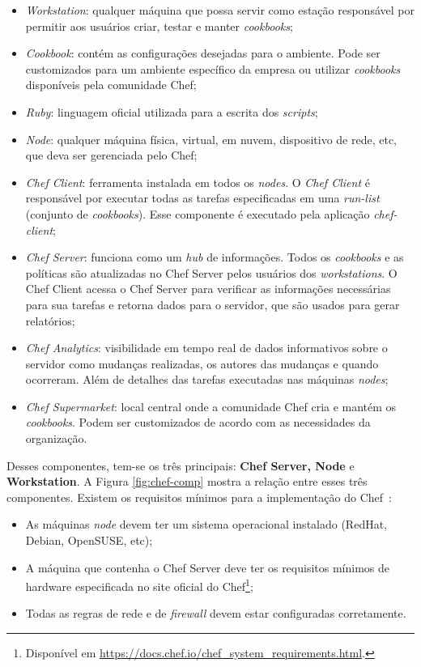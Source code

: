 \begin{itemize}
  \item \textit{Workstation}: qualquer máquina que possa servir como estação
    responsável por permitir aos usuários criar, testar e manter \textit{cookbooks};
  \item \textit{Cookbook}: contém as configurações desejadas para o ambiente.
    Pode ser customizados para um ambiente específico da empresa ou utilizar
    \textit{cookbooks} disponíveis pela comunidade Chef;
  \item \textit{Ruby}: linguagem oficial utilizada para a escrita dos \textit{scripts};
  \item \textit{Node}: qualquer máquina física, virtual, em nuvem, dispositivo
    de rede, etc, que deva ser gerenciada pelo Chef;
  \item \textit{Chef Client}: ferramenta instalada em todos os \textit{nodes}. O
    \textit{Chef Client} é responsável por executar todas as tarefas especificadas
    em uma \textit{run-list} (conjunto de \textit{cookbooks}). Esse componente é
    executado pela aplicação \textit{chef-client};
  \item \textit{Chef Server}: funciona como um \textit{hub} de informações. Todos os
    \textit{cookbooks} e as políticas são atualizadas no Chef Server pelos usuários
    dos \textit{workstations}. O Chef Client acessa o Chef Server para verificar
    as informações necessárias para sua tarefas e retorna dados para o servidor,
    que são usados para gerar relatórios;
  \item \textit{Chef Analytics}: visibilidade em tempo real de dados informativos
    sobre o servidor como mudanças realizadas, os autores das mudanças e quando
    ocorreram. Além de detalhes das tarefas executadas nas máquinas \textit{nodes};
  \item \textit{Chef Supermarket}: local central onde a comunidade Chef cria e
    mantém os \textit{cookbooks}. Podem ser customizados de acordo com as necessidades
    da organização.
\end{itemize}

Desses componentes, tem-se os três principais: \textbf{Chef Server, Node} e \textbf{Workstation}.
A Figura \ref{fig:chef-comp} mostra a relação entre esses três componentes. Existem os requisitos
mínimos para a implementação do Chef~\cite{chefdoc:2016}:

\begin{itemize}
  \item As máquinas \textit{node} devem ter um sistema operacional instalado (RedHat,
    Debian, OpenSUSE, etc);
  \item A máquina que contenha o Chef Server deve ter os requisitos
      mínimos de hardware especificada no site oficial do Chef\footnote{Disponível em \url{https://docs.chef.io/chef\_system\_requirements.html}.};
  \item Todas as regras de rede e de \textit{firewall} devem estar configuradas
    corretamente.
\end{itemize}

